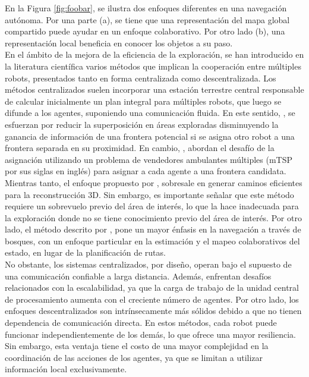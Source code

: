 \documentclass[sigconf]{acmart}
\begin{document}
En la Figura \ref{fig:foobar}, se ilustra dos enfoques diferentes en una navegación autónoma. Por una parte (a), se tiene que una representación del mapa global compartido puede ayudar en un enfoque colaborativo. Por otro lado (b), una representación local beneficia en conocer los objetos a su paso.\\%

En el ámbito de la mejora de la eficiencia de la exploración, se han introducido en la literatura científica varios métodos que implican la cooperación entre múltiples robots, presentados tanto en forma centralizada como descentralizada. Los métodos centralizados suelen incorporar una estación terrestre central responsable de calcular inicialmente un plan integral para múltiples robots, que luego se difunde a los agentes, suponiendo una comunicación fluida. En este sentido, \citeauthor{1435481} \cite{1435481}, se esfuerzan por reducir la superposición en áreas exploradas disminuyendo la ganancia de información de una frontera potencial si se asigna otro robot a una frontera separada en su proximidad. En cambio, \citeauthor{Tian} \cite{Tian}, abordan el desafío de la asignación utilizando un problema de vendedores ambulantes múltiples (mTSP por sus siglas en inglés) para asignar a cada agente a una frontera candidata. Mientras tanto, el enfoque propuesto por \citeauthor{9844235} \cite{9844235}, sobresale en generar caminos eficientes para la reconstrucción 3D. Sin embargo, es importante señalar que este método requiere un sobrevuelo previo del área de interés, lo que la hace inadecuada para la exploración donde no se tiene conocimiento previo del área de interés. Por otro lado, el método descrito por \citeauthor{Tian} \cite{Tian}, pone un mayor énfasis en la navegación a través de bosques, con un enfoque particular en la estimación y el mapeo colaborativos del estado, en lugar de la planificación de rutas.\\

No obstante, los sistemas centralizados, por diseño, operan bajo el supuesto de una comunicación confiable a larga distancia. Además, enfrentan desafíos relacionados con la escalabilidad, ya que la carga de trabajo de la unidad central de procesamiento aumenta con el creciente número de agentes. Por otro lado, los enfoques descentralizados son intrínsecamente más sólidos debido a que no tienen dependencia de comunicación directa. En estos métodos, cada robot puede funcionar independientemente de los demás, lo que ofrece una mayor resiliencia. Sin embargo, esta ventaja tiene el costo de una mayor complejidad en la coordinación de las acciones de los agentes, ya que se limitan a utilizar información local exclusivamente.\\
\end{document}
